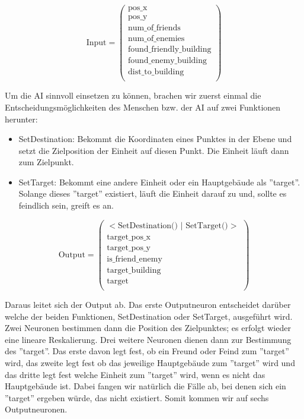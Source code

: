\documentclass[
	12pt,
	a4paper,
	BCOR10mm,
	DIV14,
	headsepline,
	usegeometry,
]{scrreprt}
\begin{document}
\begin{equation}
	\text{Input} = \left( \begin{matrix}
		\text{pos\_x} \\
		\text{pos\_y} \\
	\text{num\_of\_friends} \\
		\text{num\_of\_enemies} \\
		\text{found\_friendly\_building} \\
		\text{found\_enemy\_building} \\
		\text{dist\_to\_building} \\
	\end{matrix} \right)
\end{equation}


Um die AI sinnvoll einsetzen zu können, brachen wir zuerst einmal die Entscheidungsmöglichkeiten des Menschen bzw. der AI auf zwei Funktionen herunter: 

\begin{itemize}
	\item SetDestination: Bekommt die Koordinaten eines Punktes in der Ebene und setzt die Zielposition der Einheit auf diesen Punkt.
Die Einheit läuft dann zum Zielpunkt.
	\item SetTarget: Bekommt eine andere Einheit oder ein Hauptgebäude als ''target''.
Solange dieses ''target'' existiert, läuft die Einheit darauf zu und, sollte es feindlich sein, greift es an.
\end{itemize}

\begin{equation}
	\text{Output} = \left( \begin{matrix}
		<\text{SetDestination() | SetTarget()}> \\
		\text{target\_pos\_x} \\
		\text{target\_pos\_y} \\
		\text{is\_friend\_enemy} \\
		\text{target\_building} \\
		\text{target} \\
	\end{matrix} \right)
\end{equation}

Daraus leitet sich der Output ab.
Das erste Outputneuron entscheidet darüber welche der beiden Funktionen, SetDestination oder SetTarget, ausgeführt wird.
Zwei Neuronen bestimmen dann die Position des Zielpunktes; es erfolgt wieder eine lineare Reskalierung.
Drei weitere Neuronen dienen dann zur Bestimmung des ''target''.
Das erste davon legt fest, ob ein Freund oder Feind zum ''target'' wird, das zweite legt fest ob das jeweilige Hauptgebäude zum ''target'' wird und das dritte legt fest welche Einheit zum ''target'' wird, wenn es nicht das Hauptgebäude ist.
Dabei fangen wir natürlich die Fälle ab, bei denen sich ein ''target'' ergeben würde, das nicht existiert.
Somit kommen wir auf sechs Outputneuronen.
\end{document}

